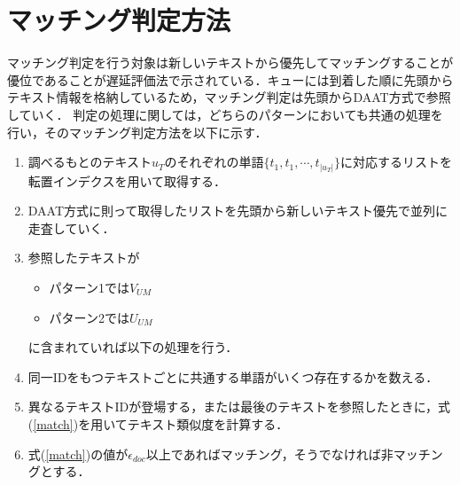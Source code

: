\section{マッチング判定方法}

マッチング判定を行う対象は新しいテキストから優先してマッチングすることが優位であることが遅延評価法で示されている．キューには到着した順に先頭からテキスト情報を格納しているため，マッチング判定は先頭からDAAT方式で参照していく．
判定の処理に関しては，どちらのパターンにおいても共通の処理を行い，そのマッチング判定方法を以下に示す．
\begin{enumerate}
    \item 調べるもとのテキスト$u_T$のそれぞれの単語$\{t_1, t_1, \cdots, t_{|u_T|}\}$に対応するリストを転置インデクスを用いて取得する．
    \item DAAT方式に則って取得したリストを先頭から新しいテキスト優先で並列に走査していく．
    \item 参照したテキストが
    \begin{itemize}
        \item パターン1では$V_{UM}$
        \item パターン2では$U_{UM}$
    \end{itemize}
    に含まれていれば以下の処理を行う．
    \item 同一IDをもつテキストごとに共通する単語がいくつ存在するかを数える．
    \item 異なるテキストIDが登場する，または最後のテキストを参照したときに，式(\ref{match})を用いてテキスト類似度を計算する．
    \item 式(\ref{match})の値が$\epsilon_{doc}$以上であればマッチング，そうでなければ非マッチングとする．
\end{enumerate}